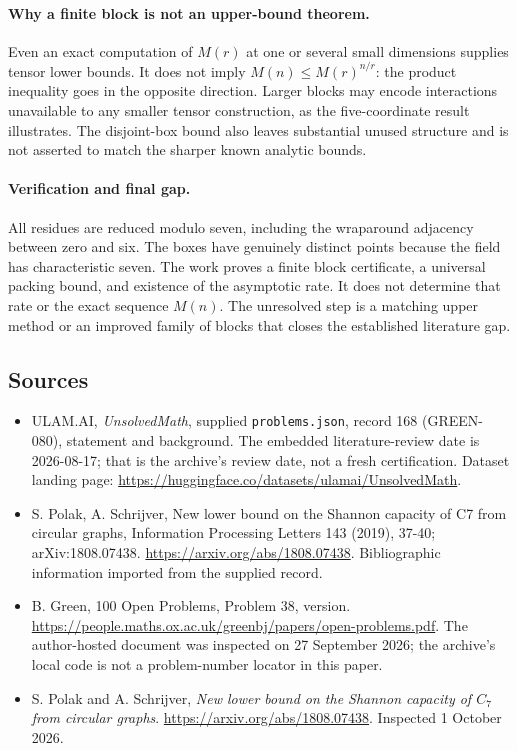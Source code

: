 \documentclass[11pt,a4paper]{article}
\begin{document}
\paragraph{Why a finite block is not an upper-bound theorem.}
Even an exact computation of $M(r)$ at one or several small dimensions supplies tensor lower bounds. It does not imply $M(n)\leq M(r)^{n/r}$: the product inequality goes in the opposite direction. Larger blocks may encode interactions unavailable to any smaller tensor construction, as the five-coordinate result illustrates. The disjoint-box bound also leaves substantial unused structure and is not asserted to match the sharper known analytic bounds.

\paragraph{Verification and final gap.}
All residues are reduced modulo seven, including the wraparound adjacency between zero and six. The boxes have genuinely distinct points because the field has characteristic seven. The work proves a finite block certificate, a universal packing bound, and existence of the asymptotic rate. It does not determine that rate or the exact sequence $M(n)$. The unresolved step is a matching upper method or an improved family of blocks that closes the established literature gap.

\subsection{Sources}

{\small

\begin{itemize}

\item[\hypertarget{source:168:1}{S1}] ULAM.AI, \emph{UnsolvedMath}, supplied \texttt{problems.json}, record 168 (GREEN-080), statement and background. The embedded literature-review date is 2026-08-17; that is the archive’s review date, not a fresh certification. Dataset landing page: \url{https://huggingface.co/datasets/ulamai/UnsolvedMath}.

\item[\hypertarget{source:168:2}{S2}] S. Polak, A. Schrijver, New lower bound on the Shannon capacity of C7 from circular graphs, Information Processing Letters 143 (2019), 37-40; arXiv:1808.07438. \url{https://arxiv.org/abs/1808.07438}. Bibliographic information imported from the supplied record.

\item[\hypertarget{source:168:3}{S3}] B. Green, 100 Open Problems, Problem 38, version. \url{https://people.maths.ox.ac.uk/greenbj/papers/open-problems.pdf}. The author-hosted document was inspected on 27 September 2026; the archive’s local code is not a problem-number locator in this paper.

\item[E1] S. Polak and A. Schrijver, \emph{New lower bound on the Shannon capacity of $C_7$ from circular graphs}. \url{https://arxiv.org/abs/1808.07438}. Inspected 1 October 2026.

\end{itemize}

}

\label{end:168}
\end{document}
